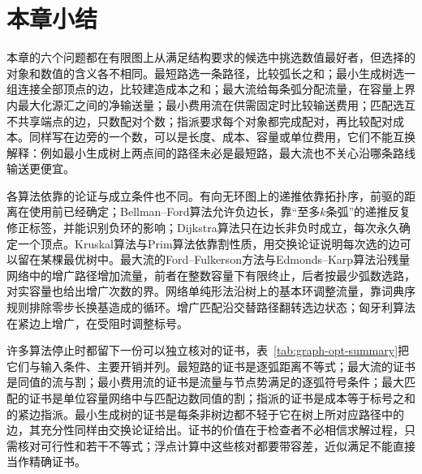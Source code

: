 
\section{本章小结}
\label{sec:graph-optimization-summary}

本章的六个问题都在有限图上从满足结构要求的候选中挑选数值最好者，但选择的对象和数值的含义各不相同。最短路选一条路径，比较弧长之和；最小生成树选一组连接全部顶点的边，比较建造成本之和；最大流给每条弧分配流量，在容量上界内最大化源汇之间的净输送量；最小费用流在供需固定时比较输送费用；匹配选互不共享端点的边，只数配对个数；指派要求每个对象都完成配对，再比较配对成本。同样写在边旁的一个数，可以是长度、成本、容量或单位费用，它们不能互换解释：例如最小生成树上两点间的路径未必是最短路，最大流也不关心沿哪条路线输送更便宜。

各算法依靠的论证与成立条件也不同。有向无环图上的递推依靠拓扑序，前驱的距离在使用前已经确定；Bellman--Ford算法允许负边长，靠“至多$k$条弧”的递推反复修正标签，并能识别负环的影响；Dijkstra算法只在边长非负时成立，每次永久确定一个顶点。Kruskal算法与Prim算法依靠割性质，用交换论证说明每次选的边可以留在某棵最优树中。最大流的Ford--Fulkerson方法与Edmonds--Karp算法沿残量网络中的增广路径增加流量，前者在整数容量下有限终止，后者按最少弧数选路，对实容量也给出增广次数的界。网络单纯形法沿树上的基本环调整流量，靠词典序规则排除零步长换基造成的循环。增广匹配沿交替路径翻转选边状态；匈牙利算法在紧边上增广，在受阻时调整标号。

许多算法停止时都留下一份可以独立核对的证书，表~\ref{tab:graph-opt-summary}把它们与输入条件、主要开销并列。最短路的证书是逐弧距离不等式；最大流的证书是同值的流与割；最小费用流的证书是流量与节点势满足的逐弧符号条件；最大匹配的证书是单位容量网络中与匹配边数同值的割；指派的证书是成本等于标号之和的紧边指派。最小生成树的证书是每条非树边都不轻于它在树上所对应路径中的边，其充分性同样由交换论证给出。证书的价值在于检查者不必相信求解过程，只需核对可行性和若干不等式；浮点计算中这些核对都要带容差，近似满足不能直接当作精确证书。

